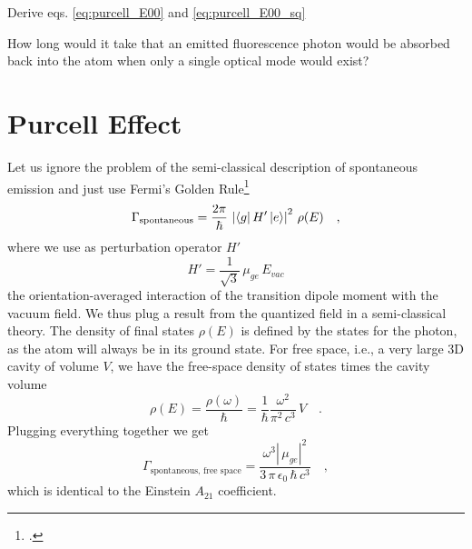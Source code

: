 \begin{questions}
\item Derive eqs. \ref{eq:purcell_E00} and \ref{eq:purcell_E00_sq}

\item How long would it take that an emitted  fluorescence photon would be absorbed back into the atom when only a single optical mode would exist?
\end{questions}




\section{Purcell Effect}

Let us ignore the problem of the semi-classical description of spontaneous emission and just use Fermi's Golden Rule\footcite[chapter 10.3]{Fox}
\begin{equation}
 \Gamma_\text{spontaneous} = \frac{2 \pi}{\hbar} \, \left| \bra{g} H' \ket{e} \right|^2 \, \rho(E) \quad ,
\end{equation}
where we use as perturbation operator $H'$ 
\begin{equation}
H' = \frac{1}{\sqrt{3}} \, \mu_{ge} \, E_{vac}
\end{equation}
the orientation-averaged interaction of the transition dipole moment with the vacuum field. We thus plug a result from the quantized field in a semi-classical theory.
The density of final states $\rho(E)$ is defined by the states for the photon, as the atom will always be in its ground state. For free space, i.e., a very large 3D cavity of volume $V$, we have the free-space density of states  times the cavity volume
\begin{equation}
 \rho(E) = \frac{\rho(\omega) }{\hbar } = \frac{1}{\hbar} \frac{\omega^2}{ \pi^2 \, c^3 } \, V \quad .
\end{equation}
Plugging everything together we get
%
\begin{equation}
 \Gamma_\text{spontaneous, free space} =  \frac{\omega^3  \left| \, \mu_{ge} \right|^2   }{ 3\, \pi  \, \epsilon_0 \, \hbar \, c^3   }  \quad , \label{eq:purcell_gamma_sp}
\end{equation}
which is identical to the Einstein $A_{21}$ coefficient.


